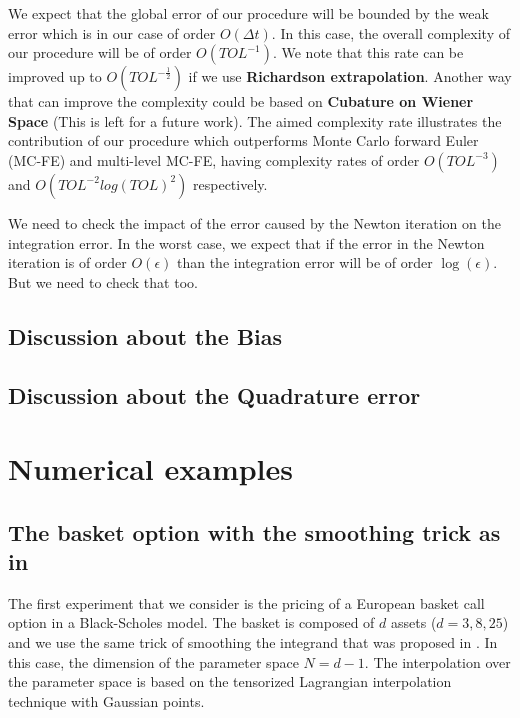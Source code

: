 \documentclass[11pt]{article}
\begin{document}
\begin{remark}
	We expect that the global error of our procedure will be bounded by the weak error which is in our case of order $O(\Delta t)$. In this case, the overall complexity of our procedure will be of order $O(TOL^{-1})$. We note that this rate can be improved up to $O(TOL^{-\frac{1}{2}})$ if we use \textbf{Richardson extrapolation}. Another way that can improve the complexity could be based on \textbf{Cubature on Wiener Space} (This is left for a future work). The aimed complexity rate illustrates the contribution of our procedure which outperforms  Monte Carlo forward Euler (MC-FE) and multi-level MC-FE, having complexity rates of order $O(TOL^{-3})$  and $O(TOL^{-2} log(TOL)^2)$  respectively. 
\end{remark}


\begin{remark}
	\item We need to check the impact of the error caused by the Newton iteration on the integration error. In the worst case, we expect that if the error in the Newton iteration is of order $O(\epsilon)$ than the integration error will be of order $\operatorname{log}(\epsilon)$. But we need to check that too.
	\end{remark}



\subsection{Discussion about the Bias}

\subsection{Discussion about the Quadrature error}
\newpage
\section{Numerical examples}

\subsection{The basket option with the smoothing trick as in \cite{bayersmoothing}}\label{sec:The basket option with smoothing trick with a time stepping procedure}

The first experiment that we consider is the pricing of  a European  basket call option in a Black-Scholes model. The basket is composed of $d$ assets ($d=3,8,25$) and we use the same trick of smoothing the integrand that was proposed in \cite{bayersmoothing}. In this case, the dimension of the parameter space $N=d-1$. The interpolation over the parameter space is based on the tensorized Lagrangian interpolation technique with Gaussian  points.
\end{document}
